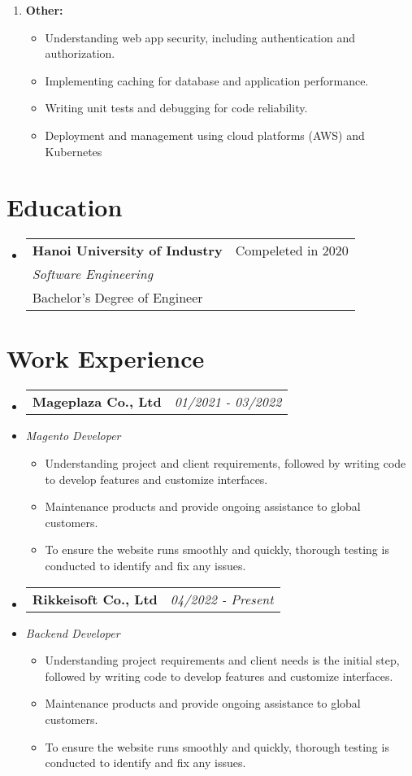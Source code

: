 \documentclass[letterpaper,11pt]{article}
\makeatletter
\newcommand{\resumeItem}[1]{
  \item\small{
    {#1 \vspace{-2pt}}
  }
}
\newcommand{\resumeEducationHeading}[4]{
  \vspace{-2pt}\item
    \begin{tabular*}{0.97\textwidth}[t]{l@{\extracolsep{\fill}}r}
      \textbf{#1} & #2 \\
      \textit{\small#3} \\
      {\small#4}\\
    \end{tabular*}\vspace{-5pt}
}
\newcommand{\resumeSubHeadingListStart}{\begin{itemize}[leftmargin=0.15in, label={}]}
\newcommand{\resumeSubHeadingListEnd}{\end{itemize}}
\newcommand{\resumeWorkExStart}[3]{
  \begin{itemize}[leftmargin=0.15in, label={}]%
  \item \begin{tabular*}{0.97\textwidth}[t]{l@{\extracolsep{\fill}}r}%
    \textbf{#1} & \textit{\small{#2}}%
  \end{tabular*}%
  \vspace{-3pt}\item \textit{#3}%
  \begin{itemize}%
}
\newcommand{\resumeWorkExEnd}{\end{itemize}\end{itemize}}
\makeatother
\begin{document}
    \begin{enumerate}[label=•]
      \item \textbf{Other:}
      \begin{itemize}[label=-, topsep=-1.5pt]
        \item Understanding web app security, including authentication and authorization.
        \item Implementing caching for database and application performance.
        \item Writing unit tests and debugging for code reliability.
        \item Deployment and management using cloud platforms (AWS) and Kubernetes
      \end{itemize}
    \end{enumerate}


\section{Education}
  \vspace{3pt}
  \resumeSubHeadingListStart
    
    \resumeEducationHeading
      {Hanoi University of Industry}
      {Compeleted in 2020}
      {Software Engineering}
      {Bachelor's Degree of Engineer}
  \resumeSubHeadingListEnd



\section{Work Experience}
  \resumeWorkExStart{Mageplaza Co., Ltd}{01/2021 - 03/2022}{Magento Developer}
    \resumeItem{Understanding project and client requirements, followed by writing code to develop features and customize interfaces.}
    \resumeItem{Maintenance products and provide ongoing assistance to global customers.}
    \resumeItem{To ensure the website runs smoothly and quickly, thorough testing is conducted to identify and fix any issues.}
  \resumeWorkExEnd

  \resumeWorkExStart{Rikkeisoft Co., Ltd}{04/2022 - Present}{Backend Developer}
    \resumeItem{Understanding project requirements and client needs is the initial step, followed by writing code to develop features and customize interfaces.}
    \resumeItem{Maintenance products and provide ongoing assistance to global customers.}
    \resumeItem{To ensure the website runs smoothly and quickly, thorough testing is conducted to identify and fix any issues.}
  \resumeWorkExEnd
\end{document}
